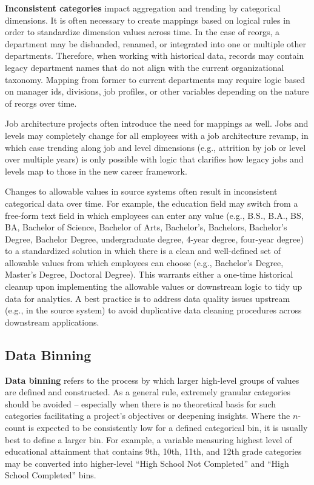 \documentclass[
]{book}
\begin{document}
\textbf{Inconsistent categories} impact aggregation and trending by categorical dimensions. It is often necessary to create mappings based on logical rules in order to standardize dimension values across time. In the case of reorgs, a department may be disbanded, renamed, or integrated into one or multiple other departments. Therefore, when working with historical data, records may contain legacy department names that do not align with the current organizational taxonomy. Mapping from former to current departments may require logic based on manager ids, divisions, job profiles, or other variables depending on the nature of reorgs over time.

Job architecture projects often introduce the need for mappings as well. Jobs and levels may completely change for all employees with a job architecture revamp, in which case trending along job and level dimensions (e.g., attrition by job or level over multiple years) is only possible with logic that clarifies how legacy jobs and levels map to those in the new career framework.

Changes to allowable values in source systems often result in inconsistent categorical data over time. For example, the education field may switch from a free-form text field in which employees can enter any value (e.g., B.S., B.A., BS, BA, Bachelor of Science, Bachelor of Arts, Bachelor's, Bachelors, Bachelor's Degree, Bachelor Degree, undergraduate degree, 4-year degree, four-year degree) to a standardized solution in which there is a clean and well-defined set of allowable values from which employees can choose (e.g., Bachelor's Degree, Master's Degree, Doctoral Degree). This warrants either a one-time historical cleanup upon implementing the allowable values or downstream logic to tidy up data for analytics. A best practice is to address data quality issues upstream (e.g., in the source system) to avoid duplicative data cleaning procedures across downstream applications.

\hypertarget{data-binning}{%
\subsection{Data Binning}\label{data-binning}}

\textbf{Data binning} refers to the process by which larger high-level groups of values are defined and constructed. As a general rule, extremely granular categories should be avoided -- especially when there is no theoretical basis for such categories facilitating a project's objectives or deepening insights. Where the \(n\)-count is expected to be consistently low for a defined categorical bin, it is usually best to define a larger bin. For example, a variable measuring highest level of educational attainment that contains 9th, 10th, 11th, and 12th grade categories may be converted into higher-level ``High School Not Completed'' and ``High School Completed'' bins.
\end{document}
